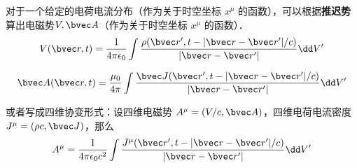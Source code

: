 

对于一个给定的电荷电流分布（作为关于时空坐标 $x^\mu$ 的函数），可以根据\textbf{推迟势}算出电磁势$V,\bvec A$（作为关于时空坐标 $x^\mu$ 的函数）．
\begin{equation}
V(\bvec r,t)=\frac{1}{4\pi\epsilon_0}\int \frac{\rho(\bvec r',t-|\bvec r-\bvec r'|/c)}{|\bvec r-\bvec r'|}\dd V'
\end{equation}

\begin{equation}
\bvec A(\bvec r,t)=\frac{\mu_0}{4\pi}\int \frac{\bvec J(\bvec r',t-|\bvec r-\bvec r'|/c)}{|\bvec r-\bvec r'|}\dd V'
\end{equation}

或者写成四维协变形式：设四维电磁势 $A^\mu=(V/c,\bvec A)$，四维电荷电流密度 $J^\mu=(\rho c,\bvec J)$，那么
\begin{equation}
A^\mu=\frac{1}{4\pi\epsilon_0c^2}\int \frac{J^\mu(\bvec r',t-|\bvec r-\bvec r'|/c)}{|\bvec r-\bvec r'|}\dd V'
\end{equation}